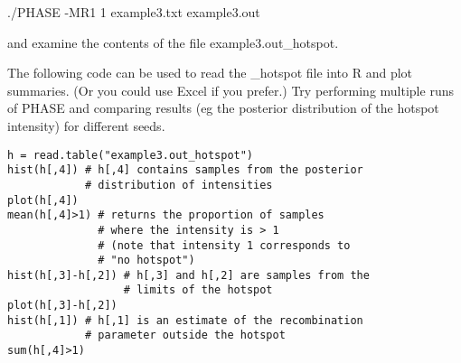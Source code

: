 ./PHASE -MR1 1 example3.txt example3.out

and examine the contents of the file example3.out\_hotspot.

\es\bs

The following code can be used to read the \_hotspot file into R and plot summaries.
(Or you could use Excel if you prefer.) Try performing multiple runs
of PHASE and comparing results (eg the posterior distribution of the hotspot
intensity) for different seeds.

\begin{verbatim}
h = read.table("example3.out_hotspot")
hist(h[,4]) # h[,4] contains samples from the posterior 
            # distribution of intensities
plot(h[,4])
mean(h[,4]>1) # returns the proportion of samples 
              # where the intensity is > 1
              # (note that intensity 1 corresponds to 
              # "no hotspot")
hist(h[,3]-h[,2]) # h[,3] and h[,2] are samples from the 
                  # limits of the hotspot
plot(h[,3]-h[,2])
hist(h[,1]) # h[,1] is an estimate of the recombination
            # parameter outside the hotspot
sum(h[,4]>1)
\end{verbatim}



